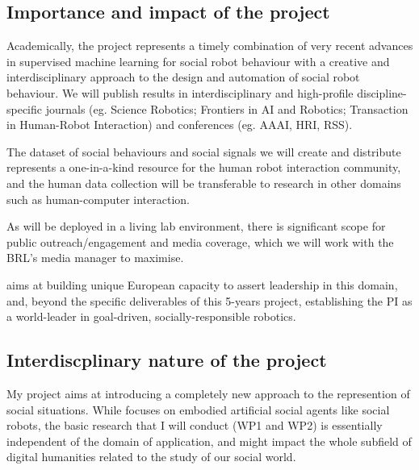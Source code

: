 \subsection{Importance and impact of the project}

\begin{rewrite}

Academically, the \project project represents a timely combination of
very recent advances in supervised machine learning for social robot
behaviour with a creative and interdisciplinary approach to the design
and automation of social robot behaviour. 
We will publish \project results in interdisciplinary and high-profile
discipline-specific journals (eg. Science Robotics; Frontiers in AI and
Robotics; Transaction in Human-Robot Interaction) and conferences (eg. AAAI,
HRI, RSS).

The dataset of social behaviours and social signals we will create and
distribute represents a one-in-a-kind resource for the human robot
interaction community, and the human data collection will be
transferable to research in other domains such as human-computer
interaction.

As \project will be deployed in a living lab environment, there is
significant scope for public outreach/engagement and media coverage,
which we will work with the BRL's media manager to maximise.


\project aims at building unique European capacity to assert leadership in this
domain, and, beyond the specific deliverables of this 5-years project,
establishing the PI as a world-leader in goal-driven, socially-responsible
robotics.

\end{rewrite}

\subsection{Interdiscplinary nature of the project}

My project aims at introducing a completely new approach to the represention of
social situations. While \project focuses on embodied artificial social agents
like social robots, the basic research that I will conduct (WP1 and WP2) is
essentially independent of the domain of application, and might impact the whole
subfield of digital humanities related to the study of our social world.

